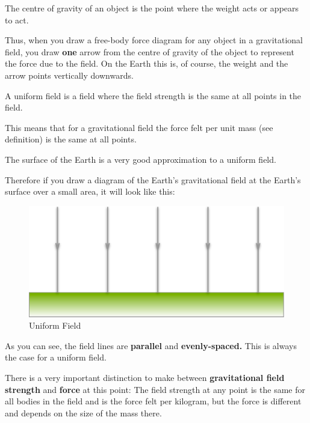 \documentclass[main.tex]{subfiles}
\begin{document}

The centre of gravity of an object is the point where the weight acts or
appears to act.

Thus, when you draw a free-body force diagram for any object in a
gravitational field, you draw \textbf{one} arrow from the centre of
gravity of the object to represent the force due to the field. On the
Earth this is, of course, the weight and the arrow points vertically
downwards.


A uniform field is a field where the field strength is the same at all
points in the field.

This means that for a gravitational field the force felt per unit mass
(see definition) is the same at all points.

The surface of the Earth is a very good approximation to a uniform
field.

Therefore if you draw a diagram of the Earth's gravitational field at
the Earth's surface over a small area, it will look like this:

\begin{figure}[h]
	\begin{center}
		\includegraphics[width=\textwidth]{figs/chapt-2/uniform-field.pdf}
	\end{center}
	\caption{Uniform Field}
\end{figure}

As you can see, the field lines are \textbf{parallel} and
\textbf{evenly-spaced.} This is always the case for a uniform field.


There is a very important distinction to make between
\textbf{gravitational field strength} and \textbf{force} at this point:
The field strength at any point is the same for all bodies in the field
and is the force felt per kilogram, but the force is different and
depends on the size of the mass there.
\end{document}
